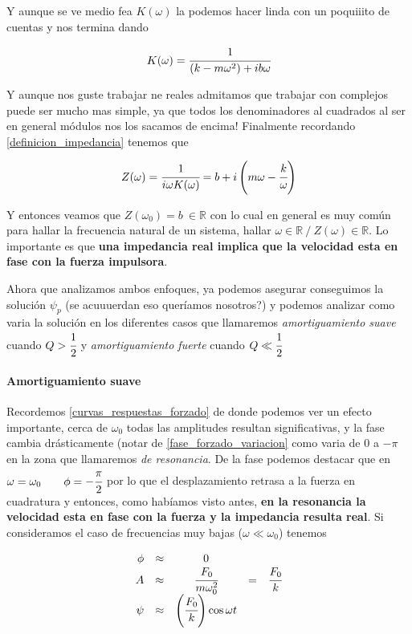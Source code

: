 \documentclass[a4paper,spanish]{article}
\def\R {\mathbb{R}}
\numberwithin{equation}{section}
\begin{document}
Y aunque se ve medio fea $K(\omega)$ la podemos hacer linda con un poquiiito de cuentas y nos termina dando

\begin{equation}
K(\omega)=\cfrac{1}{\left( k-m\omega^2\right) + ib\omega}
\end{equation}

Y aunque nos guste trabajar ne reales admitamos que trabajar con complejos puede ser mucho mas simple, ya que todos los denominadores al cuadrados al ser en general m\'odulos nos los sacamos de encima! Finalmente recordando \ref{definicion_impedancia} tenemos que

\begin{equation}
Z(\omega)=\cfrac{1}{i \omega K(\omega)}=b + i\left(m\omega-\cfrac{k}{\omega}\right)
\end{equation}

Y entonces veamos que $Z(\omega_0)=b \ \in\R$ con lo cual en general es muy com\'un para hallar la frecuencia natural de un sistema, hallar $\omega \in \R \ / \ Z(\omega)\in\R$. Lo importante es que \textbf{una impedancia real implica que la velocidad esta en fase con la fuerza impulsora}.

Ahora que analizamos ambos enfoques, ya podemos asegurar conseguimos la soluci\'on $\psi_p$ (se acuuuerdan eso quer\'iamos nosotros?) y podemos analizar como varia la soluci\'on en los diferentes casos que llamaremos \textit{amortiguamiento suave} cuando $Q>\cfrac{1}{2}$ y \textit{amortiguamiento fuerte} cuando $Q \ll \cfrac{1}{2}$

\paragraph*{Amortiguamiento suave}

Recordemos \ref{curvas_respuestas_forzado} de donde podemos ver un efecto importante, cerca de $\omega_0$ todas las amplitudes resultan significativas, y la fase cambia dr\'asticamente (notar de \ref{fase_forzado_variacion} como varia de 0 a $-\pi$ en la zona que llamaremos \textit{de resonancia}. De la fase podemos destacar que en $\omega=\omega_0 \qquad \phi=-\cfrac{\pi}{2}$ por lo que el desplazamiento retrasa a la fuerza en cuadratura y entonces, como hab\'iamos visto antes, \textbf{en la resonancia la velocidad esta en fase con la fuerza y la impedancia resulta real}.
Si consideramos el caso de frecuencias muy bajas ($\omega\ll\omega_0$) tenemos

\begin{equation}
\begin{array}{rcccl}
\phi & \approx & 0 \\
A & \approx & \cfrac{F_0}{m\omega_0 ^2}&=& \cfrac{F_0}{k} \\
\psi & \approx & \left(\cfrac{F_0}{k}\right) \cos{\omega t}
\end{array}
\label{aproximacion_frecuencias_bajas_forzado}
\end{equation}
\end{document}
